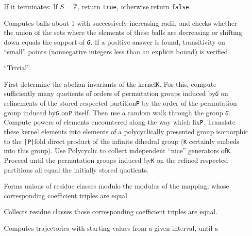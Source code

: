 \documentclass[a4paper,11pt]{report}
\begin{document}
{\begin{description}
 If it terminates: If $S = {\ensuremath{\mathbb Z}}$, return \texttt{true}, otherwise return \texttt{false}. 
\item[{ \texttt{IsTransitiveOnNonnegativeIntegersInSupport(\mbox{\texttt{\mdseries\slshape G}})} }]  Computes balls about 1 with successively increasing radii, and checks whether
the union of the sets where the elements of these balls are decreasing or
shifting down equals the support of \mbox{\texttt{\mdseries\slshape G}}. If a positive answer is found, transitivity on ``small'' points (nonnegative integers less than an explicit bound) is verified. 
\item[{ \texttt{IsZero(\mbox{\texttt{\mdseries\slshape f}})} }]  ``Trivial''. 
\item[{ \texttt{KernelOfActionOnRespectedPartition(\mbox{\texttt{\mdseries\slshape G}})} }]  First determine the abelian invariants of the kernel{\nobreakspace}\texttt{K}. For this, compute sufficiently many quotients of orders of permutation
groups induced by{\nobreakspace}\mbox{\texttt{\mdseries\slshape G}} on refinements of the stored respected partition{\nobreakspace}\texttt{P} by the order of the permutation group induced by{\nobreakspace}\mbox{\texttt{\mdseries\slshape G}} on{\nobreakspace}\texttt{P} itself. Then use a random walk through the group \mbox{\texttt{\mdseries\slshape G}}. Compute powers of elements encountered along the way which
fix{\nobreakspace}\texttt{P}. Translate these kernel elements into elements of a polycyclically presented
group isomorphic to the \texttt{|P|}\texttt{}fold direct product of the infinite dihedral group (\texttt{K} certainly embeds into this group). Use \textsf{Polycyclic}{\nobreakspace}\cite{Polycyclic} to collect independent ``nice'' generators of{\nobreakspace}\texttt{K}. Proceed until the permutation groups induced by{\nobreakspace}\texttt{K} on the refined respected partitions all equal the initially stored quotients. 
\item[{ \texttt{LargestSourcesOfAffineMappings(\mbox{\texttt{\mdseries\slshape f}})} }]  Forms unions of residue classes modulo the modulus of the mapping, whose
corresponding coefficient triples are equal. 
\item[{ \texttt{LaTeXStringRcwaMapping(\mbox{\texttt{\mdseries\slshape f}})}, {\nobreakspace} \texttt{LaTeXAndXDVI(\mbox{\texttt{\mdseries\slshape f}})} }]  Collects residue classes those corresponding coefficient triples are equal. 
\item[{ \texttt{LikelyContractionCentre(\mbox{\texttt{\mdseries\slshape f}},\mbox{\texttt{\mdseries\slshape maxn}},\mbox{\texttt{\mdseries\slshape bound}})} }]  Computes trajectories with starting values from a given interval, until a

\end{description}}
\end{document}
